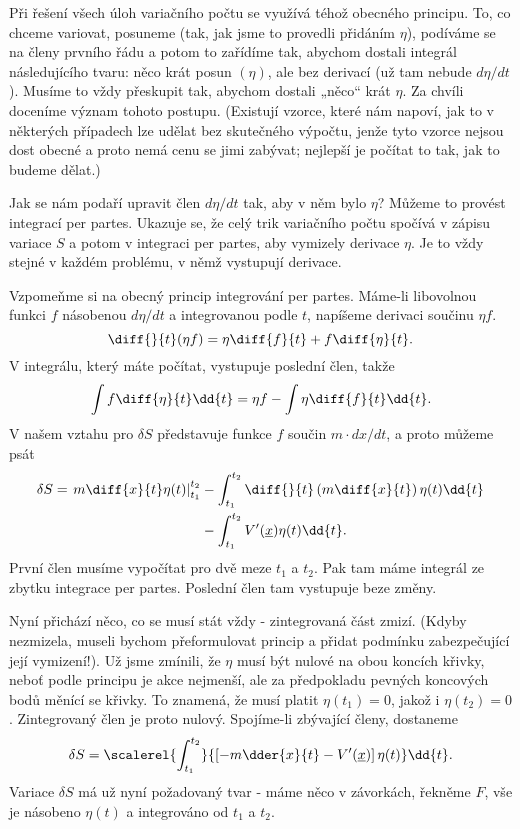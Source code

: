     Při řešení všech úloh variačního počtu se využívá téhož obecného principu. To, co chceme
    variovat, posuneme (tak, jak jsme to provedli přidáním \(\eta\)), podíváme se na členy prvního
    řádu a potom to zařídíme tak, abychom dostali integrál následujícího tvaru: něco krát posun
    \((\eta)\), ale bez derivací (už tam nebude \(d\eta/dt\)). Musíme to vždy přeskupit tak, abychom
    dostali „něco“ krát \(\eta\). Za chvíli doceníme význam tohoto postupu. (Existují vzorce, které
    nám napoví, jak to v některých případech lze udělat bez skutečného výpočtu, jenže tyto vzorce
    nejsou dost obecné a proto nemá cenu se jimi zabývat; nejlepší je počítat to tak, jak to budeme
    dělat.)

    Jak se nám podaří upravit člen \(d\eta/dt\) tak, aby v něm bylo \(\eta\)? Můžeme to provést
    integrací per partes. Ukazuje se, že celý trik variačního počtu spočívá v zápisu variace \(S\) a
    potom v integraci per partes, aby vymizely derivace \(\eta\). Je to vždy stejné v každém
    problému, v němž vystupují derivace. 
    
    Vzpomeňme si na obecný princip integrování per partes. Máme-li libovolnou funkci \(f\) násobenou
    \(d\eta/dt\) a integrovanou podle \(t\), napíšeme derivaci součinu \(\eta f\).
    \begin{equation*}
      \diff{}{t}(\eta f) = \eta\diff{f}{t} + f\diff{\eta}{t}.
    \end{equation*}  
    V integrálu, který máte počítat, vystupuje poslední člen, takže
    \begin{equation*}
      \int f\diff{\eta}{t}\dd{t} = \eta f - \int\eta\diff{f}{t}\dd{t}.
    \end{equation*}  
    V našem vztahu pro \(\delta S\) představuje funkce \(f\) součin \(m\cdot dx/dt\), a proto můžeme
    psát
    \begin{align*}
      \delta S = \left.m\diff{x}{t}\eta(t)\right\rvert^{t_2}_{t_1} 
               &- \int^{t_2}_{t_1}\diff{}{t}\left(m\diff{x}{t}\right)\eta(t)\dd{t}   \\
               &- \int^{t_2}_{t_1} V'(\underline{x})\eta(t)\dd{t}.
    \end{align*} 
    První člen musíme vypočítat pro dvě meze \(t_1\) a \(t_2\). Pak tam máme integrál ze zbytku
    integrace per partes. Poslední člen tam vystupuje beze změny.

    Nyní přichází něco, co se musí stát vždy - zintegrovaná část zmizí. (Kdyby nezmizela, museli
    bychom přeformulovat princip a přidat podmínku zabezpečující její vymizení!). Už jsme zmínili,
    že \(\eta\) musí být nulové na obou koncích křivky, neboť podle principu je akce nejmenší, ale
    za předpokladu pevných koncových bodů měnící se křivky. To znamená, že musí platit \(\eta(t_1)
    =0\), jakož i \(\eta(t_2) = 0\). Zintegrovaný člen je proto nulový. Spojíme-li zbývající členy,
    dostaneme
    \begin{equation*}
      \delta S = \scalerel{\int^{t_2}_{t_1}}{
        \left[-m\dder{x}{t} -V'(\underline{x})\right]\eta(t)
      }\dd{t}.
    \end{equation*} 
    Variace \(\delta S\) má už nyní požadovaný tvar - máme něco v závorkách, řekněme \(F\), vše je
    násobeno \(\eta(t)\) a integrováno od \(t_1\) a \(t_2\).

